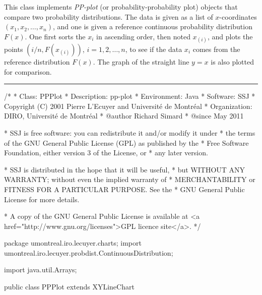 
This class implements \emph{PP-plot} (or probability-probability plot)
objects that compare two probability distributions.
The data is given as a list of $x$-coordinates $(x_1, x_2, \ldots, x_{n})$,
and one is given a reference continuous probability distribution  $F(x)$.
One first sorts the $x_i$ in ascending order, then noted $x_{(i)}$, and
plots the points $(i/n, F(x_{(i)}))$, $i= 1, 2, \ldots, n$, to see if
the data $x_i$ comes from the reference distribution  $F(x)$.
The graph of the straight line $y=x$ is also plotted for comparison.


\bigskip\hrule
\begin{code}
\begin{hide}
/*
 * Class:        PPPlot
 * Description:  pp-plot
 * Environment:  Java
 * Software:     SSJ 
 * Copyright (C) 2001  Pierre L'Ecuyer and Université de Montréal
 * Organization: DIRO, Université de Montréal
 * @author       Richard Simard
 * @since        May 2011

 * SSJ is free software: you can redistribute it and/or modify it under
 * the terms of the GNU General Public License (GPL) as published by the
 * Free Software Foundation, either version 3 of the License, or
 * any later version.

 * SSJ is distributed in the hope that it will be useful,
 * but WITHOUT ANY WARRANTY; without even the implied warranty of
 * MERCHANTABILITY or FITNESS FOR A PARTICULAR PURPOSE.  See the
 * GNU General Public License for more details.

 * A copy of the GNU General Public License is available at
   <a href="http://www.gnu.org/licenses">GPL licence site</a>.
 */
\end{hide}
package umontreal.iro.lecuyer.charts;
   import umontreal.iro.lecuyer.probdist.ContinuousDistribution;\begin{hide}
   import java.util.Arrays;
\end{hide}


public class PPPlot extends XYLineChart \begin{hide} {
   private double[][] U;        // u_i = cdf(x_i)
   private double[][] Lin;      // line y = x

   private void initLinear ()
   {
      // line y = x in [0, 1] by steps of h
      int m = 100;
      double h = 1.0 / m;
      Lin = new double[2][m+1];
      for (int i = 0; i <= m; i++)
         Lin[0][i] = Lin[1][i] = h * i;
   }


   private void initPoints (ContinuousDistribution dist, double[] data,
                            int numPoints)
   {
      int i;
      U = new double[2][numPoints];

      for (i = 0; i < numPoints; i++)
         U[1][i] = dist.cdf(data[i]);
      Arrays.sort(U[1]);
      for (i = 0; i < numPoints; i++)
         U[0][i] = (double) (i+1)/numPoints;
   }\end{hide}
\end{code}

